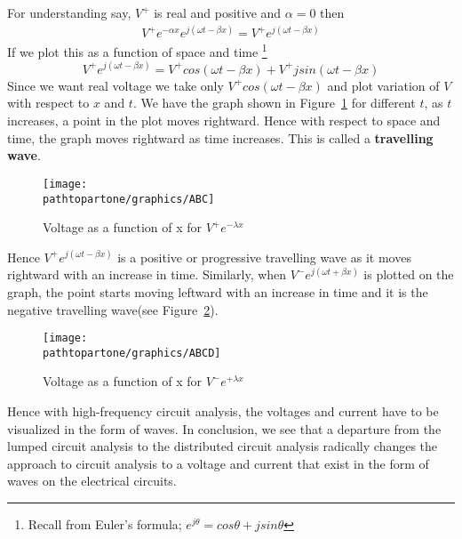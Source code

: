 For understanding say, $  V^{+} $ is real and positive and $ \alpha= 0 $ then
\begin{align*}
V^{+}e^{-\alpha x}e^{j( \omega t-\beta x)} = V^{+} e^{j( \omega t-\beta x)}
\end{align*}
If we plot this as a function of space and time
\footnote{Recall from Euler's formula; $ e^{j\theta} = cos\theta + jsin\theta $}
\begin{equation*}
V^{+}e^{j( \omega t-\beta x)} = V^{+}cos(\omega t- \beta x) +  V^{+}jsin(\omega t- \beta x)
\end{equation*}
Since we want real voltage we take only $ V^{+}cos(\omega t- \beta x) $ and plot variation of $ V $ with respect to $ x $ and $ t $. We have the graph shown in Figure~\ref{fig:abc} for different $ t $, as $ t $ increases, a point in the plot moves rightward. Hence with respect to space and time, the graph moves rightward as time increases. This is called a \textbf{travelling wave}.
\begin{figure}[h]
\centering
\texttt{[image: \\pathtopartone/graphics/ABC]}
\caption{Voltage as a function of x for $V^+e^{-\lambda x}$}
\label{fig:abc}
\end{figure}

Hence  $ V^{+}e^{j(\omega t- \beta x )} $ is a positive or progressive travelling wave as it moves rightward with an increase in time. Similarly, when $ V^{-}e^{j( \omega t+ \beta x )} $ is plotted on the graph, the point starts moving leftward with an increase in time and it is the negative travelling wave(see Figure~\ref{fig:abcd}).
\begin{figure}[h]
\centering
\texttt{[image: \\pathtopartone/graphics/ABCD]}
\caption{Voltage as a function of x for $V^-e^{+\lambda x}$}
\label{fig:abcd}
\end{figure}

Hence with high-frequency circuit analysis, the voltages and current have to be visualized in the form of waves. In conclusion, we see that a departure from the lumped circuit analysis to the distributed circuit analysis radically changes the approach to circuit analysis to a voltage and current that exist in the form of waves on the electrical circuits. 

